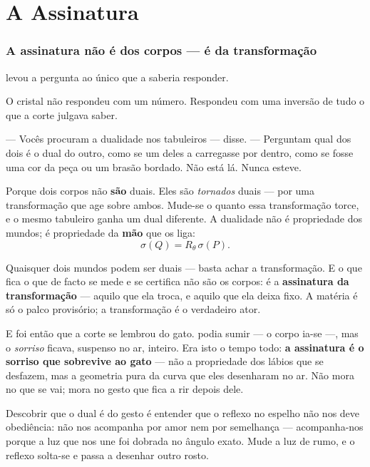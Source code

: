 \documentclass[livro.tex]{subfiles}
\begin{document}
\part{A Assinatura}

\section{A assinatura não é dos corpos --- é da transformação}

\Joa levou a pergunta ao único que a saberia responder.

O cristal \Lck não respondeu com um número. Respondeu com uma inversão de tudo o
que a corte julgava saber.

--- Vocês procuram a dualidade nos tabuleiros --- disse. --- Perguntam qual dos dois
é o dual do outro, como se um deles a carregasse por dentro, como se fosse uma cor da
peça ou um brasão bordado. Não está lá. Nunca esteve.

\medskip

Porque dois corpos não \textbf{são} duais. Eles são \emph{tornados} duais --- por uma
transformação que age sobre ambos. Mude-se o quanto essa transformação torce, e o mesmo
tabuleiro ganha um dual diferente. A dualidade não é propriedade dos mundos; é
propriedade da \textbf{mão} que os liga:
\[ \sigma(Q) = R_\theta\,\sigma(P). \]

\medskip

Quaisquer dois mundos podem ser duais --- basta achar a transformação. E o que fica
o que de facto se mede e se certifica não são os corpos: é a
\textbf{assinatura da transformação} --- aquilo que ela troca, e aquilo que ela deixa
fixo. A matéria é só o palco provisório; a transformação é o verdadeiro ator.

\medskip

E foi então que a corte se lembrou do gato. \Ben podia sumir --- o corpo ia-se
---, mas o \emph{sorriso} ficava, suspenso no ar, inteiro. Era isto o tempo todo:
\textbf{a assinatura é o sorriso que sobrevive ao gato} --- não a propriedade dos lábios
que se desfazem, mas a geometria pura da curva que eles desenharam no ar. Não mora no que
se vai; mora no gesto que fica a rir depois dele.

\medskip

Descobrir que o dual é do gesto é entender que o reflexo no espelho não nos deve
obediência: não nos acompanha por amor nem por semelhança --- acompanha-nos porque a luz
que nos une foi dobrada no ângulo exato. Mude a luz de rumo, e o reflexo solta-se e passa
a desenhar outro rosto.
\end{document}
